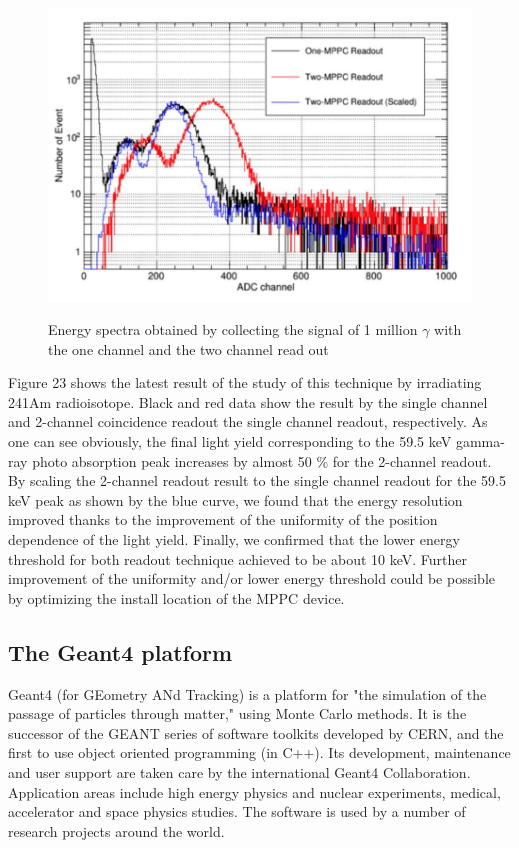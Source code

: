 \documentclass[12pt, a4paper,titlepage]{article}
\numberwithin{equation}{section}
\numberwithin{figure}{section}
\begin{document}
\begin{figure}[H]
\centering
\includegraphics[width=130.0mm]{images/histo_for_det.png}
\label{fig:spectras_meas}
\caption{Energy spectra obtained by collecting the signal of 1 million $\gamma$ with the one channel and the two channel read out}
\end{figure}

Figure 23 shows the latest result of the study of this technique by irradiating 241Am radioisotope. Black and red data show the result by the single channel and 2-channel coincidence readout the single channel readout, respectively. As one can see obviously, the final light yield corresponding to the 59.5 keV gamma-ray photo absorption peak increases by almost 50 \% for the 2-channel readout. By scaling  the 2-channel readout result to the single channel readout for the 59.5 keV peak as shown by the blue curve, we found that the energy resolution improved thanks to the improvement of the uniformity of the position dependence of the light yield. Finally, we confirmed that the lower energy threshold for both readout technique achieved to be about 10 keV. Further improvement of the uniformity and/or lower energy threshold could be possible by optimizing the install location of the MPPC device.

\subsection{The Geant4 platform}

Geant4 \cite{geant1, geant2, geant3} (for GEometry ANd Tracking) is a platform for "the simulation of the passage of particles through matter," using Monte Carlo methods. It is the successor of the GEANT series of software toolkits developed by CERN, and the first to use object oriented programming (in C++). Its development, maintenance and user support are taken care by the international Geant4 Collaboration. Application areas include high energy physics and nuclear experiments, medical, accelerator and space physics studies. The software is used by a number of research projects around the world.
\end{document}
